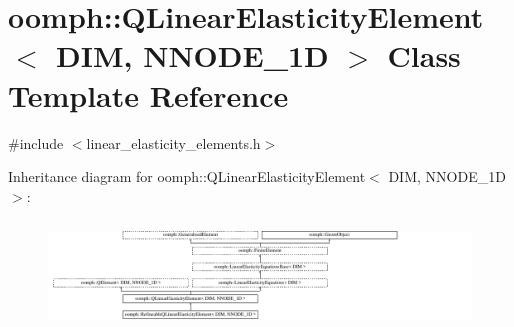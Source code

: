 \hypertarget{classoomph_1_1QLinearElasticityElement}{}\section{oomph\+:\+:Q\+Linear\+Elasticity\+Element$<$ D\+IM, N\+N\+O\+D\+E\+\_\+1D $>$ Class Template Reference}
\label{classoomph_1_1QLinearElasticityElement}


{\ttfamily \#include $<$linear\+\_\+elasticity\+\_\+elements.\+h$>$}

Inheritance diagram for oomph\+:\+:Q\+Linear\+Elasticity\+Element$<$ D\+IM, N\+N\+O\+D\+E\+\_\+1D $>$\+:\begin{figure}[H]
\begin{center}
\leavevmode
\includegraphics[height=2.894057cm]{classoomph_1_1QLinearElasticityElement}
\end{center}
\end{figure}

